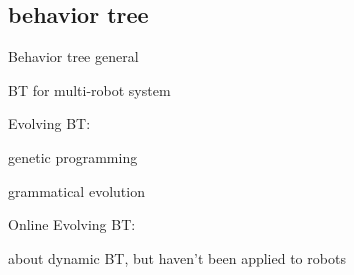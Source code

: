 \cite{kolling2013human}


\subsection{behavior tree}

Behavior tree general
\cite{colledanchise2018behavior}
\cite{iovino2022survey}

BT for multi-robot system
\cite{colledanchise2016advantages}
\cite{jeong2022behavior}

Evolving BT:

genetic programming
\cite{jones2018evolving}
\cite{kuckling2022automode}

grammatical evolution
\cite{neupane2019learning}
\cite{kuckling2022automode}

Online Evolving BT:

\cite{jones2019onboard}
\cite{venkata2023kt}


\cite{florez2008dynamic} about dynamic BT, but haven't been applied to robots
















